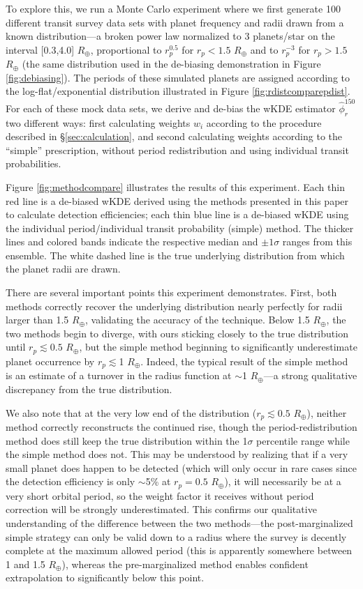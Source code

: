 \documentclass[iop]{emulateapj}
\def\Rearth{R_\oplus}
\begin{document}
To explore this, we run a Monte Carlo experiment where we first generate 100 different transit survey data sets with planet frequency and radii drawn from a known distribution---a broken power law normalized to 3 planets/star on the interval [0.3,4.0] $\Rearth$, proportional to $r_p^{0.5}$ for  $r_p < 1.5$ $\Rearth$ and to $r_p^{-3}$ for $r_p > 1.5$ $\Rearth$ (the same distribution used in the de-biasing demonstration in Figure \ref{fig:debiasing}).  The periods of these simulated planets are assigned according to the log-flat/exponential distribution illustrated in Figure \ref{fig:rdistcomparepdist}.  For each of these mock data sets, we derive and de-bias the wKDE estimator $\hat\phi_r^{150}$ two different ways: first calculating weights $w_i$ according to the procedure described in \S\ref{sec:calculation}, and second calculating weights according to the ``simple'' prescription, without period redistribution and using individual transit probabilities.  

Figure \ref{fig:methodcompare} illustrates the results of this experiment.   Each thin red line is a de-biased wKDE derived using the methods presented in this paper to calculate detection efficiencies; each thin blue line is a de-biased wKDE using the individual period/individual transit probability (simple) method.  The thicker lines and colored bands indicate the respective median and $\pm 1$$\sigma$ ranges from this ensemble. The white dashed line is the true underlying distribution from which the planet radii are drawn.  

There are several important points this experiment demonstrates.  First, both methods correctly recover the underlying distribution nearly perfectly for radii larger than 1.5 $\Rearth$, validating the accuracy of the technique.  Below 1.5 $\Rearth$, the two methods begin to diverge, with ours sticking closely to the true distribution until $r_p \lesssim 0.5$ $\Rearth$, but the simple method beginning to significantly underestimate planet occurrence by $r_p \lesssim $1 $\Rearth$.  Indeed, the typical result of the simple method is an estimate of a turnover in the radius function at $\sim$1 $\Rearth$---a strong qualitative discrepancy from the true distribution.   

We also note that at the very low end of the distribution ($r_p \lesssim 0.5$ $\Rearth$), neither method correctly reconstructs the continued rise, though the period-redistribution method does still keep the true distribution within the 1$\sigma$ percentile  range while the simple method does not.  This may be understood by realizing that if a very small planet does happen to be detected (which will only occur in rare cases since the detection efficiency is only $\sim$5\% at $r_p=0.5$ $\Rearth$), it will necessarily be at a very short orbital period, so the weight factor it receives without period correction will be strongly underestimated.   This confirms our qualitative understanding of the difference between the two methods---the post-marginalized simple strategy can only be valid down to a radius where the survey is decently complete at the maximum allowed period (this is apparently somewhere between 1 and 1.5 $\Rearth$), whereas the pre-marginalized method enables confident extrapolation to significantly below this point.
\end{document}

